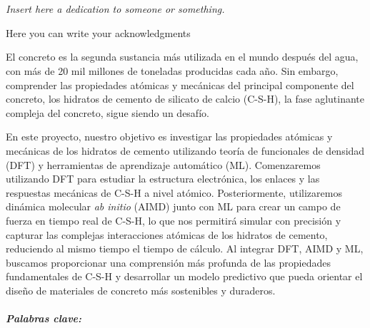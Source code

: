 \documentclass[11pt, titlepage, twoside, openright, usernames, dvipsnames]{thesis}
\theoremstyle{definition}
\theoremstyle{definition}
\begin{document}
\let\cleardoublepage\clearpage
%
%

\chapter*{}
  \begin{center}
\fontsize{12}{15}\selectfont \textit{Insert here a dedication to someone or something.}
\vfill
  \end{center}


\begin{acknowledgements}
Here you can write your acknowledgments 
\end{acknowledgements}

\begin{Resumen}
El concreto es la segunda sustancia más utilizada en el mundo después del agua, con más de 20 mil millones de toneladas producidas cada año. Sin embargo, comprender las propiedades atómicas y mecánicas del principal componente del concreto, los hidratos de cemento de silicato de calcio (C-S-H), la fase aglutinante compleja del concreto, sigue siendo un desafío.

En este proyecto, nuestro objetivo es investigar las propiedades atómicas y mecánicas de los hidratos de cemento utilizando teoría de funcionales de densidad (DFT) y herramientas de aprendizaje automático (ML). Comenzaremos utilizando DFT para estudiar la estructura electrónica, los enlaces y las respuestas mecánicas de C-S-H a nivel atómico. Posteriormente, utilizaremos dinámica molecular \emph{ab initio} (AIMD) junto con ML para crear un campo de fuerza en tiempo real de C-S-H, lo que nos permitirá simular con precisión y capturar las complejas interacciones atómicas de los hidratos de cemento, reduciendo al mismo tiempo el tiempo de cálculo. Al integrar DFT, AIMD y ML, buscamos proporcionar una comprensión más profunda de las propiedades fundamentales de C-S-H y desarrollar un modelo predictivo que pueda orientar el diseño de materiales de concreto más sostenibles y duraderos. \cite{Oey} 
 \\
 \\
 \emph{\textbf{Palabras clave:}}
\end{Resumen}
\end{document}
